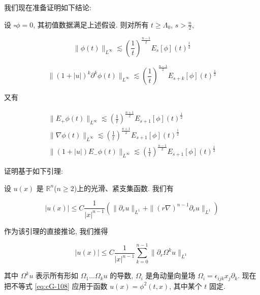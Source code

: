 我们现在准备证明如下结论:

\begin{proposition}\label{prop:cG-4.15}
设 $\square \phi = 0$, 其初值数据满足上述假设. 则对所有 $t \geq \Lambda_0$, $s > \frac{n}{2}$, 

\begin{equation}
\|\phi(t)\|_{L^{\infty}} \lesssim \left(\frac{1}{t}\right)^{\frac{n - 1}{2}}E_{s}[\phi](t)^{\frac{1}{2}}\label{eq:cG-105}
\end{equation}

\begin{equation}
\|(1 + |u|)^{k}\partial^{k}\phi(t)\|_{L^{\infty}} \lesssim \left(\frac{1}{t}\right)^{\frac{n - 1}{2}}E_{s + k}[\phi](t)^{\frac{1}{2}}\label{eq:cG-106}
\end{equation}

又有

\[
\begin{array}{r}
\|E_{+}\phi(t)\|_{L^{\infty}} \lesssim \left(\frac{1}{t}\right)^{\frac{n + 1}{2}}E_{s + 1}[\phi](t)^{\frac{1}{2}} \\
\|\nabla\phi(t)\|_{L^{\infty}} \lesssim \left(\frac{1}{t}\right)^{\frac{n + 1}{2}}E_{s + 1}[\phi](t)^{\frac{1}{2}} \\
\|(1 + |u|)E_{-}\phi(t)\|_{L^{\infty}} \lesssim \left(\frac{1}{t}\right)^{\frac{n - 1}{2}}E_{s + 1}[\phi](t)^{\frac{1}{2}}
\end{array}
\]
\end{proposition}

证明基于如下引理:

\begin{lemma}\label{lem:cG-4.16}
设 $u(x)$ 是 $\mathbb{R}^n$($n \geq 2$)上的光滑、紧支集函数. 我们有

\begin{equation}
|u(x)| \leq C\frac{1}{|x|^{n - 1}}\left(\|\partial_{r}u\|_{L^{1}} + \|(r\nabla)^{n - 1}\partial_{r}u\|_{L^{1}}\right)\label{eq:cG-107}
\end{equation}
\end{lemma}

作为该引理的直接推论, 我们推得

\begin{equation}
|u(x)| \leq C\frac{1}{|x|^{n - 1}}\sum_{k = 0}^{n - 1}\|\partial_{r}\Omega^{k}u\|_{L^{1}}\label{eq:cG-108}
\end{equation}

其中 $\Omega^{k}u$ 表示所有形如 $\Omega_{1}\ldots\Omega_{k}u$ 的导数, $\Omega_{i}$ 是角动量向量场 $\Omega_{i}=\epsilon_{ijk}x_{j}\partial_{k}$. 现在把不等式 \eqref{eq:cG-108} 应用于函数 $u(x)=\phi^{2}(t, x)$, 其中某个 $t$ 固定. 

